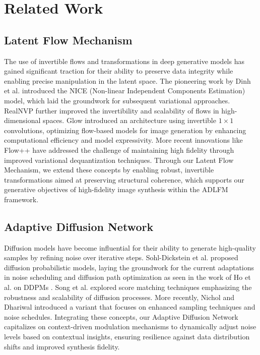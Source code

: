 \section{Related Work}

\subsection{Latent Flow Mechanism}

The use of invertible flows and transformations in deep generative models has gained significant traction for their ability to preserve data integrity while enabling precise manipulation in the latent space. The pioneering work by Dinh et al. \cite{dinh2014nice} introduced the NICE (Non-linear Independent Components Estimation) model, which laid the groundwork for subsequent variational approaches. RealNVP \cite{dinh2016density} further improved the invertibility and scalability of flows in high-dimensional spaces. Glow \cite{kingma2018glow} introduced an architecture using invertible $1\times1$ convolutions, optimizing flow-based models for image generation by enhancing computational efficiency and model expressivity. More recent innovations like Flow++ \cite{ho2019flow++} have addressed the challenge of maintaining high fidelity through improved variational dequantization techniques. Through our Latent Flow Mechanism, we extend these concepts by enabling robust, invertible transformations aimed at preserving structural coherence, which supports our generative objectives of high-fidelity image synthesis within the ADLFM framework.

\subsection{Adaptive Diffusion Network}

Diffusion models have become influential for their ability to generate high-quality samples by refining noise over iterative steps. Sohl-Dickstein et al. \cite{sohl2015deep} proposed diffusion probabilistic models, laying the groundwork for the current adaptations in noise scheduling and diffusion path optimization as seen in the work of Ho et al. on DDPMs \cite{ho2020denoising}. Song et al. \cite{song2019generative} explored score matching techniques emphasizing the robustness and scalability of diffusion processes. More recently, Nichol and Dhariwal \cite{nichol2021improved} introduced a variant that focuses on enhanced sampling techniques and noise schedules. Integrating these concepts, our Adaptive Diffusion Network capitalizes on context-driven modulation mechanisms to dynamically adjust noise levels based on contextual insights, ensuring resilience against data distribution shifts and improved synthesis fidelity.

